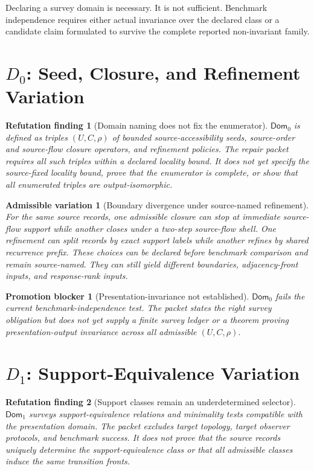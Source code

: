 \documentclass[11pt]{article}
\newcommand{\Dom}{\mathsf{Dom}}
\newtheorem{finding}{Refutation finding}
\newtheorem{variation}{Admissible variation}
\newtheorem{blocker}{Promotion blocker}
\begin{document}
Declaring a survey domain is necessary. It is not sufficient. Benchmark
independence requires either actual invariance over the declared class or a
candidate claim formulated to survive the complete reported non-invariant
family.

\section{\texorpdfstring{\(D_0\)}{D0}: Seed, Closure, and Refinement Variation}

\begin{finding}[Domain naming does not fix the enumerator]
\(\Dom_0\) is defined as triples \((U,C,\rho)\) of bounded
source-accessibility seeds, source-order and source-flow closure operators,
and refinement policies. The repair packet requires all such triples within a
declared locality bound. It does not yet specify the source-fixed locality
bound, prove that the enumerator is complete, or show that all enumerated
triples are output-isomorphic.
\end{finding}

\begin{variation}[Boundary divergence under source-named refinement]
For the same source records, one admissible closure can stop at immediate
source-flow support while another closes under a two-step source-flow shell.
One refinement can split records by exact support labels while another
refines by shared recurrence prefix. These choices can be declared before
benchmark comparison and remain source-named. They can still yield different
boundaries, adjacency-front inputs, and response-rank inputs.
\end{variation}

\begin{blocker}[Presentation-invariance not established]
\(\Dom_0\) fails the current benchmark-independence test. The packet states
the right survey obligation but does not yet supply a finite survey ledger or
a theorem proving presentation-output invariance across all admissible
\((U,C,\rho)\).
\end{blocker}

\section{\texorpdfstring{\(D_1\)}{D1}: Support-Equivalence Variation}

\begin{finding}[Support classes remain an underdetermined selector]
\(\Dom_1\) surveys support-equivalence relations and minimality tests
compatible with the presentation domain. The packet excludes target topology,
target observer protocols, and benchmark success. It does not prove that the
source records uniquely determine the support-equivalence class or that all
admissible classes induce the same transition fronts.
\end{finding}
\end{document}
